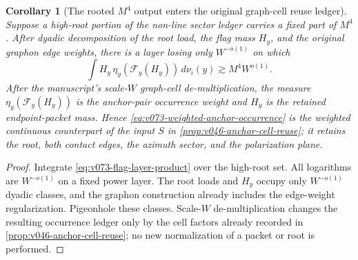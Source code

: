 \documentclass[10pt]{article}
\newtheorem{corollary}[theorem]{Corollary}
\begin{document}
\begin{corollary}[The rooted \(M^4\) output enters the original graph-cell reuse ledger]
\label{cor:v073-rooted-to-anchor-reuse}
Suppose a high-root portion of the non-line sector ledger carries a fixed part of \(M^4\).  After
dyadic decomposition of the root load, the flag mass \(H_y\), and the original graphon edge
weights, there is a layer losing only \(W^{-o(1)}\) on which
\begin{equation}
\label{eq:v073-weighted-anchor-occurrence}
\boxed{
\int H_y\,\eta_y(\mathscr F_y(H_y))\,d\nu_i(y)
\gtrsim
M^4W^{o(1)}.
}
\end{equation}
After the manuscript's scale-\(W\) graph-cell de-multiplication, the measure
\(\eta_y(\mathscr F_y(H_y))\) is the anchor-pair occurrence weight and \(H_y\) is the retained
endpoint-packet mass.  Hence \eqref{eq:v073-weighted-anchor-occurrence} is the weighted continuous
counterpart of the input \(S\) in
\cref{prop:v046-anchor-cell-reuse}; it retains the root, both contact edges, the azimuth sector,
and the polarization plane.
\end{corollary}

\begin{proof}
Integrate \eqref{eq:v073-flag-layer-product} over the high-root set.  All logarithms are
\(W^{-o(1)}\) on a fixed power layer.  The root loads and \(H_y\) occupy only
\(W^{-o(1)}\) dyadic classes, and the graphon construction already includes the edge-weight
regularization.  Pigeonhole these classes.  Scale-\(W\) de-multiplication changes the resulting
occurrence ledger only by the cell factors already recorded in
\cref{prop:v046-anchor-cell-reuse}; no new normalization of a packet or root is performed.
\end{proof}
\end{document}
